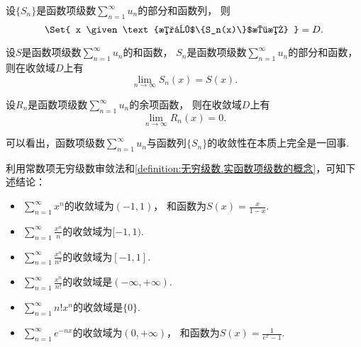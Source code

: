 \begin{proposition}
设\(\{S_n\}\)是函数项级数\(\sum_{n=1}^\infty u_n\)的部分和函数列，
则\begin{equation*}
	\Set{ x \given \text{数列$\{S_n(x)\}$收敛} } = D.
\end{equation*}
\end{proposition}
\begin{proposition}
设\(S\)是函数项级数\(\sum_{n=1}^\infty u_n\)的和函数，
\(S_n\)是函数项级数\(\sum_{n=1}^\infty u_n\)的部分和函数，
则在收敛域\(D\)上有\begin{equation*}
	\lim_{n\to\infty} S_n(x) = S(x).
\end{equation*}
\end{proposition}
\begin{proposition}
设\(R_n\)是函数项级数\(\sum_{n=1}^\infty u_n\)的余项函数，
则在收敛域\(D\)上有\begin{equation*}
	\lim_{n\to\infty} R_n(x) = 0.
\end{equation*}
\end{proposition}
\begin{remark}
可以看出，函数项级数\(\sum_{n=1}^\infty u_n\)与函数列\(\{S_n\}\)的收敛性在本质上完全是一回事.
\end{remark}

\begin{example}
利用常数项无穷级数审敛法和\cref{definition:无穷级数.实函数项级数的概念}，可知下述结论：
\begin{itemize}
	\item \(\sum_{n=1}^\infty x^n\)的收敛域为\((-1,1)\)，
	和函数为\(S(x) = \frac{x}{1-x}\).
	\item \(\sum_{n=1}^\infty \frac{x^n}{n}\)的收敛域为\([-1,1)\).
	\item \(\sum_{n=1}^\infty \frac{x^n}{n^2}\)的收敛域为\([-1,1]\).
	\item \(\sum_{n=1}^\infty \frac{x^n}{n!}\)的收敛域是\((-\infty,+\infty)\).
	\item \(\sum_{n=1}^\infty n! x^n\)的收敛域是\(\{0\}\).
	\item \(\sum_{n=1}^\infty e^{-nx}\)的收敛域为\((0,+\infty)\)，
	和函数为\(S(x) = \frac1{e^x-1}\).
\end{itemize}
\end{example}

